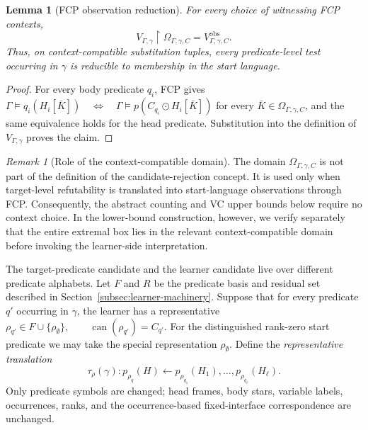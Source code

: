 \documentclass[11pt]{article}
\newtheorem{lemma}[theorem]{Lemma}
\theoremstyle{definition}
\theoremstyle{remark}
\newtheorem{remark}[theorem]{Remark}
\begin{document}
\begin{lemma}[FCP observation reduction]\label{lem:fcp-observation}
For every choice of witnessing FCP contexts,
\[
\boxed{
V_{\Gamma,\gamma}\restriction\Omega_{\Gamma,\gamma,C}
=
V^{\mathrm{obs}}_{\Gamma,\gamma,C}.
}
\]
Thus, on context-compatible substitution tuples, every predicate-level test
occurring in \(\gamma\) is reducible to membership in the start language.
\end{lemma}

\begin{proof}
For every body predicate \(q_i\), FCP gives
\(\Gamma\models q_i(H_i[\bar K]) \quad\Longleftrightarrow\quad \Gamma\models p(C_{q_i}\odot H_i[\bar K])\)
for every \(\bar K\in\Omega_{\Gamma,\gamma,C}\), and the same equivalence holds
for the head predicate. Substitution into the definition of
\(V_{\Gamma,\gamma}\) proves the claim.
\end{proof}

\begin{remark}[Role of the context-compatible domain]
The domain \(\Omega_{\Gamma,\gamma,C}\) is not part of the definition of the
candidate-rejection concept.  It is used only when target-level refutability
is translated into start-language observations through FCP.  Consequently,
the abstract counting and VC upper bounds below require no context choice.  In
the lower-bound construction, however, we verify separately that the entire
extremal box lies in the relevant context-compatible domain before invoking
the learner-side interpretation.
\end{remark}

The target-predicate candidate and the learner candidate live over different
predicate alphabets.  Let \(F\) and \(R\) be the predicate basis and residual
set described in Section~\ref{subsec:learner-machinery}.  Suppose that for
every predicate \(q'\) occurring in \(\gamma\), the learner has a
representative
\(\rho_{q'}\in F\cup\{\rho_\emptyset\}, \qquad \operatorname{can}(\rho_{q'})=C_{q'}.\)
For the distinguished rank-zero start predicate we may take the special
representation \(\rho_\emptyset\).
Define the \emph{representative translation}
\[
\tau_\rho(\gamma):
 p_{\rho_q}(H)
 \leftarrow
 p_{\rho_{q_1}}(H_1),\ldots,p_{\rho_{q_\ell}}(H_\ell).
\]
Only predicate symbols are changed; head frames, body stars, variable labels,
occurrences, ranks, and the occurrence-based fixed-interface correspondence are
unchanged.
\end{document}
